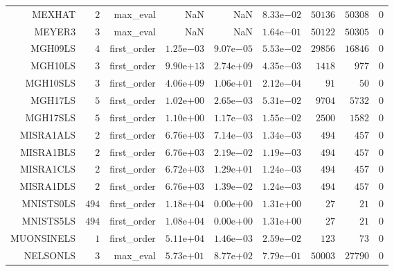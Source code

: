 \begin{longtable}{rrrrrrrrr}
MEXHAT & \(     2\) & max\_eval &       NaN &       NaN & \( 8.33\)e\(-02\) & \( 50136\) & \( 50308\) & \(     0\) \\
MEYER3 & \(     3\) & max\_eval &       NaN &       NaN & \( 1.64\)e\(-01\) & \( 50122\) & \( 50305\) & \(     0\) \\
MGH09LS & \(     4\) & first\_order & \( 1.25\)e\(-03\) & \( 9.07\)e\(-05\) & \( 5.53\)e\(-02\) & \( 29856\) & \( 16846\) & \(     0\) \\
MGH10LS & \(     3\) & first\_order & \( 9.90\)e\(+13\) & \( 2.74\)e\(+09\) & \( 4.35\)e\(-03\) & \(  1418\) & \(   977\) & \(     0\) \\
MGH10SLS & \(     3\) & first\_order & \( 4.06\)e\(+09\) & \( 1.06\)e\(+01\) & \( 2.12\)e\(-04\) & \(    91\) & \(    50\) & \(     0\) \\
MGH17LS & \(     5\) & first\_order & \( 1.02\)e\(+00\) & \( 2.65\)e\(-03\) & \( 5.31\)e\(-02\) & \(  9704\) & \(  5732\) & \(     0\) \\
MGH17SLS & \(     5\) & first\_order & \( 1.10\)e\(+00\) & \( 1.17\)e\(-03\) & \( 1.55\)e\(-02\) & \(  2500\) & \(  1582\) & \(     0\) \\
MISRA1ALS & \(     2\) & first\_order & \( 6.76\)e\(+03\) & \( 7.14\)e\(-03\) & \( 1.34\)e\(-03\) & \(   494\) & \(   457\) & \(     0\) \\
MISRA1BLS & \(     2\) & first\_order & \( 6.76\)e\(+03\) & \( 2.19\)e\(-02\) & \( 1.19\)e\(-03\) & \(   494\) & \(   457\) & \(     0\) \\
MISRA1CLS & \(     2\) & first\_order & \( 6.72\)e\(+03\) & \( 1.29\)e\(+01\) & \( 1.24\)e\(-03\) & \(   494\) & \(   457\) & \(     0\) \\
MISRA1DLS & \(     2\) & first\_order & \( 6.76\)e\(+03\) & \( 1.39\)e\(-02\) & \( 1.24\)e\(-03\) & \(   494\) & \(   457\) & \(     0\) \\
MNISTS0LS & \(   494\) & first\_order & \( 1.18\)e\(+04\) & \( 0.00\)e\(+00\) & \( 1.31\)e\(+00\) & \(    27\) & \(    21\) & \(     0\) \\
MNISTS5LS & \(   494\) & first\_order & \( 1.08\)e\(+04\) & \( 0.00\)e\(+00\) & \( 1.31\)e\(+00\) & \(    27\) & \(    21\) & \(     0\) \\
MUONSINELS & \(     1\) & first\_order & \( 5.11\)e\(+04\) & \( 1.46\)e\(-03\) & \( 2.59\)e\(-02\) & \(   123\) & \(    73\) & \(     0\) \\
NELSONLS & \(     3\) & max\_eval & \( 5.73\)e\(+01\) & \( 8.77\)e\(+02\) & \( 7.79\)e\(-01\) & \( 50003\) & \( 27790\) & \(     0\) \\

\end{longtable}
